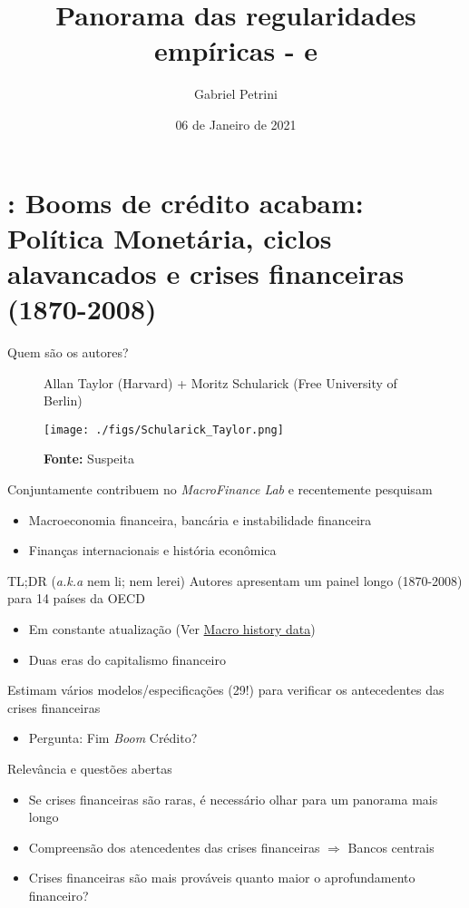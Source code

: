 \documentclass[presentation]{beamer}
\author{Gabriel Petrini}
\date{06 de Janeiro de 2021}
\title{Panorama das regularidades empíricas - \textcite{schularickCreditBoomsGone2012} e  \textcite{sharpe_2020_Why}}
\begin{document}
\maketitle
\section{\textcite{schularickCreditBoomsGone2012}: Booms de crédito acabam: Política Monetária, ciclos alavancados e crises financeiras (1870-2008)}
\label{sec:org9c2ccdb}

\begin{frame}[label={sec:orgb9f86eb}]{Quem são os autores?}
\begin{figure}[htb]
\centering
\caption{Allan Taylor (Harvard) + Moritz Schularick (Free University of Berlin)}
\texttt{[image: ./figs/Schularick\_Taylor.png]}
\label{fig:autores01}
\caption*{\textbf{Fonte:} Suspeita}
\end{figure}

Conjuntamente contribuem no \emph{MacroFinance Lab} e recentemente pesquisam

\begin{itemize}
\item Macroeconomia financeira, bancária e instabilidade financeira
\item Finanças internacionais e história econômica
\end{itemize}
\end{frame}

\begin{frame}[label={sec:orgb5cdef0}]{TL;DR (\emph{a.k.a} nem li; nem lerei)}
Autores apresentam um painel longo (1870-2008) para 14 países da OECD

\begin{itemize}
\item Em constante atualização (Ver \href{http://www.macrohistory.net/data/}{Macro history data})
\item Duas eras do capitalismo financeiro
\end{itemize}

Estimam vários modelos/especificações (29!) para verificar os antecedentes das crises financeiras
\begin{itemize}
\item \alert{Pergunta:} Fim \emph{Boom} Crédito?
\end{itemize}

\begin{block}{Relevância e questões abertas}
\begin{itemize}
\item Se crises financeiras são raras, é necessário olhar para um panorama mais longo
\item Compreensão dos atencedentes das crises financeiras \(\Rightarrow\) Bancos centrais
\item Crises financeiras são mais prováveis quanto maior o aprofundamento financeiro?
\end{itemize}
\end{block}
\end{frame}
\end{document}
